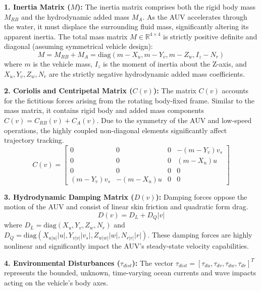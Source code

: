\documentclass[conference]{IEEEtran}
\begin{document}
\textbf{1. Inertia Matrix ($M$):} The inertia matrix comprises both the rigid body mass $M_{RB}$ and the hydrodynamic added mass $M_A$. As the AUV accelerates through the water, it must displace the surrounding fluid mass, significantly altering its apparent inertia. The total mass matrix $M \in \mathbb{R}^{4 \times 4}$ is strictly positive definite and diagonal (assuming symmetrical vehicle design):
\begin{equation}
M = M_{RB} + M_A = \text{diag}(m - X_{\dot{u}}, m - Y_{\dot{v}}, m - Z_{\dot{w}}, I_z - N_{\dot{r}})
\end{equation}
where $m$ is the vehicle mass, $I_z$ is the moment of inertia about the Z-axis, and $X_{\dot{u}}, Y_{\dot{v}}, Z_{\dot{w}}, N_{\dot{r}}$ are the strictly negative hydrodynamic added mass coefficients.

\textbf{2. Coriolis and Centripetal Matrix ($C(v)$):} The matrix $C(v)$ accounts for the fictitious forces arising from the rotating body-fixed frame. Similar to the mass matrix, it contains rigid body and added mass components $C(v) = C_{RB}(v) + C_A(v)$. Due to the symmetry of the AUV and low-speed operations, the highly coupled non-diagonal elements significantly affect trajectory tracking. 
\begin{equation}
C(v) = 
\begin{bmatrix}
0 & 0 & 0 & -(m - Y_{\dot{v}})v_s \\
0 & 0 & 0 & (m - X_{\dot{u}})u \\
0 & 0 & 0 & 0 \\
(m - Y_{\dot{v}})v_s & -(m - X_{\dot{u}})u & 0 & 0
\end{bmatrix}
\end{equation}

\textbf{3. Hydrodynamic Damping Matrix ($D(v)$):} Damping forces oppose the motion of the AUV and consist of linear skin friction and quadratic form drag. 
\begin{equation}
D(v) = D_L + D_Q|v|
\end{equation}
where $D_L = \text{diag}(X_u, Y_v, Z_w, N_r)$ and $D_Q = \text{diag}(X_{u|u|}|u|, Y_{v|v|}|v_s|, Z_{w|w|}|w|, N_{r|r|}|r|)$. These damping forces are highly nonlinear and significantly impact the AUV's steady-state velocity capabilities.

\textbf{4. Environmental Disturbances ($\tau_{dist}$):} The vector $\tau_{dist} = [\tau_{du}, \tau_{dv}, \tau_{dw}, \tau_{dr}]^T$ represents the bounded, unknown, time-varying ocean currents and wave impacts acting on the vehicle's body axes.
\end{document}
